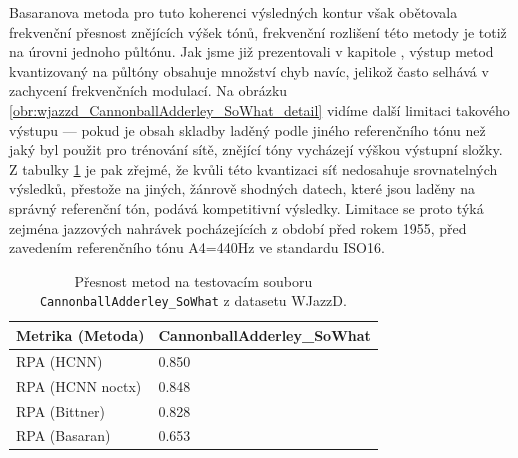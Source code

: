 Basaranova metoda pro tuto koherenci výsledných kontur však obětovala frekvenční přesnost znějících výšek tónů, frekvenční rozlišení této metody je totiž na úrovni jednoho půltónu. Jak jsme již prezentovali v kapitole , výstup metod kvantizovaný na půltóny obsahuje množství chyb navíc, jelikož často selhává v zachycení frekvenčních modulací. Na obrázku \ref{obr:wjazzd_CannonballAdderley_SoWhat_detail} vidíme další limitaci takového výstupu --- pokud je obsah skladby laděný podle jiného referenčního tónu než jaký byl použit pro trénování sítě, znějící tóny vycházejí výškou  výstupní složky. Z tabulky \ref{tab:wjazzd_CannonballAdderley_SoWhat} je pak zřejmé, že kvůli této kvantizaci síť nedosahuje srovnatelných výsledků, přestože na jiných, žánrově shodných datech, které jsou laděny na správný referenční tón, podává kompetitivní výsledky. Limitace se proto týká zejména jazzových nahrávek pocházejících z období před rokem 1955, před zavedením referenčního tónu A4=440Hz ve standardu ISO16.
\begin{table}[h]
\centering
\begin{tabular}{ll}
\toprule
 Metrika (Metoda) & CannonballAdderley\_SoWhat \\
\midrule
       RPA (HCNN) &                     0.850 \\
 RPA (HCNN noctx) &                     0.848 \\
    RPA (Bittner) &                     0.828 \\
    RPA (Basaran) &                     0.653 \\
\bottomrule
\end{tabular}



\caption{Přesnost metod na testovacím souboru \texttt{CannonballAdderley\_SoWhat} z datasetu WJazzD.}\label{tab:wjazzd_CannonballAdderley_SoWhat}
\end{table}


